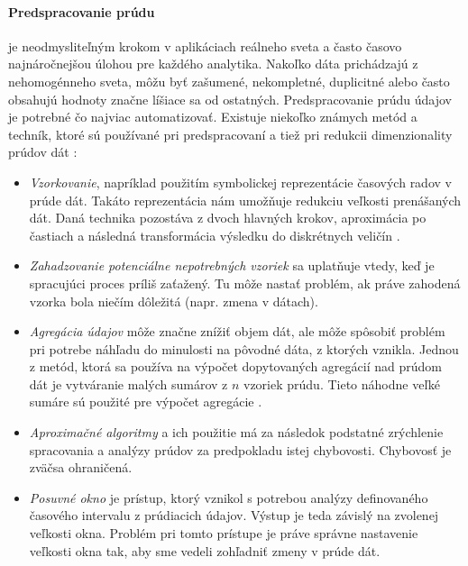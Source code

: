 \paragraph{Predspracovanie prúdu} je neodmysliteľným krokom v aplikáciach reálneho sveta a často časovo najnáročnejšou úlohou pre každého analytika. Nakoľko dáta prichádzajú z nehomogénneho sveta, môžu byť zašumené, nekompletné, duplicitné alebo často obsahujú hodnoty značne líšiace sa od ostatných. Predspracovanie prúdu údajov je potrebné čo najviac automatizovať. Existuje niekoľko známych metód a techník, ktoré sú používané pri predspracovaní a tiež pri redukcii dimenzionality prúdov dát \citep{krempl2014open, nguyen2015survey}:
\begin{itemize}
	\item \textit{Vzorkovanie}, napríklad použitím symbolickej reprezentácie časových radov v prúde dát. Takáto reprezentácia nám umožňuje redukciu veľkosti prenášaných dát. Daná technika pozostáva z dvoch hlavných krokov, aproximácia po častiach a následná transformácia výsledku do diskrétnych veličín \citep{sevcech2015symbolic}. 
	\item \textit{Zahadzovanie potenciálne nepotrebných vzoriek} sa uplatňuje vtedy, keď je spracujúci proces príliš zaťažený. Tu môže nastať problém, ak práve zahodená vzorka bola niečím dôležitá (napr. zmena v dátach).
	\item \textit{Agregácia údajov} môže značne znížiť objem dát, ale môže spôsobiť problém pri potrebe náhľadu do minulosti na pôvodné dáta, z ktorých vznikla. Jednou z metód, ktorá sa používa na výpočet dopytovaných agregácií nad prúdom dát je vytváranie malých sumárov z $n$ vzoriek prúdu. Tieto náhodne veľké sumáre sú použité pre výpočet agregácie \cite{dobra2002processing}.
	\item \textit{Aproximačné algoritmy} a ich použitie má za následok podstatné zrýchlenie spracovania a analýzy prúdov za predpokladu istej chybovosti. Chybovosť je zväčsa ohraničená.
	\item \textit{Posuvné okno} je prístup, ktorý vznikol s potrebou analýzy definovaného časového intervalu z prúdiacich údajov. Výstup je teda závislý na zvolenej veľkosti okna. Problém pri tomto prístupe je práve správne nastavenie veľkosti okna tak, aby sme vedeli zohľadniť zmeny v prúde dát.
\end{itemize}

